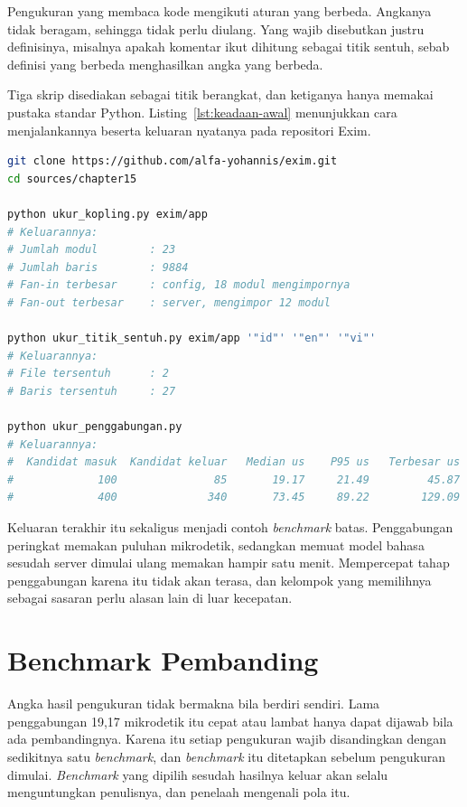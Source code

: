 Pengukuran yang membaca kode mengikuti aturan yang berbeda. Angkanya tidak
beragam, sehingga tidak perlu diulang. Yang wajib disebutkan justru definisinya,
misalnya apakah komentar ikut dihitung sebagai titik sentuh, sebab definisi
yang berbeda menghasilkan angka yang berbeda.

Tiga skrip disediakan sebagai titik berangkat, dan ketiganya hanya memakai
pustaka standar Python. Listing~\ref{lst:keadaan-awal} menunjukkan cara
menjalankannya beserta keluaran nyatanya pada repositori Exim.

\begin{lstlisting}[language=bash, caption={Mengukur keadaan awal Exim, tersedia di \berkas{sources/chapter15/README.md}}, label={lst:keadaan-awal}]
git clone https://github.com/alfa-yohannis/exim.git
cd sources/chapter15

python ukur_kopling.py exim/app
# Keluarannya:
# Jumlah modul        : 23
# Jumlah baris        : 9884
# Fan-in terbesar     : config, 18 modul mengimpornya
# Fan-out terbesar    : server, mengimpor 12 modul

python ukur_titik_sentuh.py exim/app '"id"' '"en"' '"vi"'
# Keluarannya:
# File tersentuh      : 2
# Baris tersentuh     : 27

python ukur_penggabungan.py
# Keluarannya:
#  Kandidat masuk  Kandidat keluar   Median us    P95 us   Terbesar us
#             100               85       19.17     21.49         45.87
#             400              340       73.45     89.22        129.09
\end{lstlisting}

Keluaran terakhir itu sekaligus menjadi contoh \textit{benchmark} batas.
Penggabungan peringkat memakan puluhan mikrodetik, sedangkan memuat model
bahasa sesudah server dimulai ulang memakan hampir satu menit. Mempercepat
tahap penggabungan karena itu tidak akan terasa, dan kelompok yang memilihnya
sebagai sasaran perlu alasan lain di luar kecepatan.

\section{Benchmark Pembanding}

Angka hasil pengukuran tidak bermakna bila berdiri sendiri. Lama penggabungan
19,17 mikrodetik itu cepat atau lambat hanya dapat dijawab bila ada
pembandingnya. Karena itu setiap pengukuran wajib disandingkan dengan
sedikitnya satu \textit{benchmark}, dan \textit{benchmark} itu ditetapkan
sebelum pengukuran dimulai. \textit{Benchmark} yang dipilih sesudah hasilnya
keluar akan selalu menguntungkan penulisnya, dan penelaah mengenali pola itu.

